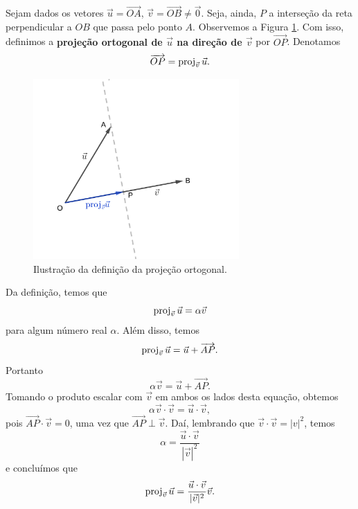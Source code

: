 Sejam dados os vetores $\vec{u}=\overrightarrow{OA}$, $\vec{v}=\overrightarrow{OB}\neq\vec{0}$. Seja, ainda, $P$ a interseção da reta perpendicular a $OB$ que passa pelo ponto $A$. Observemos a Figura \ref{fig:proj}. Com isso, definimos a {\bf projeção ortogonal de $\vec{u}$ na direção de $\vec{v}$}  por $\overrightarrow{OP}$. Denotamos
\begin{equation}
  \overrightarrow{OP} = \operatorname{proj}_{\vec{v}}\vec{u}.
\end{equation}

\begin{figure}[H]
  \centering
  \includegraphics[width=0.7\textwidth]{./cap_prodesc/dados/fig_proj/fig_proj}
  \caption{Ilustração da definição da projeção ortogonal.}
  \label{fig:proj}
\end{figure}

Da definição, temos que
\begin{equation}
  \operatorname{proj}_{\vec{v}}\vec{u} = \alpha\vec{v}
\end{equation}
para algum número real $\alpha$. Além disso, temos
\begin{equation}
  \operatorname{proj}_{\vec{v}}\vec{u} = \vec{u} + \overrightarrow{AP}.
\end{equation}
Portanto
\begin{equation}
  \alpha\vec{v} = \vec{u} + \overrightarrow{AP}.
\end{equation}
Tomando o produto escalar com $\vec{v}$ em ambos os lados desta equação, obtemos
\begin{equation}
  \alpha\vec{v}\cdot\vec{v} = \vec{u}\cdot\vec{v},
\end{equation}
pois $\overrightarrow{AP}\cdot\vec{v}=0$, uma vez que $\overrightarrow{AP}\perp\vec{v}$. Daí, lembrando que $\vec{v}\cdot\vec{v}=|v|^2$, temos
\begin{equation}
  \alpha = \frac{\vec{u}\cdot\vec{v}}{|\vec{v}|^2}
\end{equation}
e concluímos que
\begin{equation}\label{eq:proj}
  \operatorname{proj}_{\vec{v}}\vec{u} = \frac{\vec{u}\cdot\vec{v}}{|\vec{v}|^2}\vec{v}.
\end{equation}

